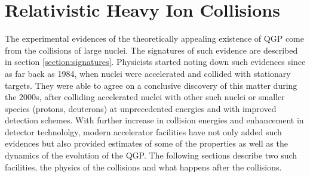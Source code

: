 \chapter{Relativistic Heavy Ion Collisions}\label{ch:RHI-collisions}
The experimental evidences of the theoretically appealing existence of QGP come from the collisions of large nuclei. The signatures of such evidence are described in section \ref{section:signatures}. Physicists started noting down such evidences since as far back as 1984, when nuclei were accelerated and collided with stationary targets.\cite{Gyulassy:2004vg} They were able to agree on a conclusive discovery of this matter during the 2000s, after colliding accelerated nuclei with other such nuclei or smaller species (protons, deuterons) at unprecedented energies and with improved detection schemes.\cite{Ritter:2004xj} With further increase in collision energies and enhancement in detector technololgy, modern accelerator facilities have not only added such evidences but also provided estimates of some of the properties as well as the dynamics of the evolution of the QGP. The following sections describe two such facilities, the physics of the collisions and what happens after the collisions.

